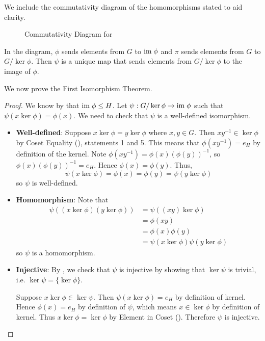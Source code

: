 We include the commutativity diagram of the homomorphisms stated to aid clarity.

\begin{figure}[h]
    \centering
    \caption{Commutativity Diagram for }
\end{figure}

In the diagram, $\phi$ sends elements from $G$ to $\mathrm{im}\;\phi$ and $\pi$ sends elements from $G$ to $G/\ker\phi$. Then $\psi$ is a unique map that sends elements from $G/\ker\phi$ to the image of $\phi$.

We now prove the First Isomorphism Theorem.

\begin{proof}
    We know by  that $\mathrm{im}\;\phi \leq H$. Let $\psi: G/\ker\phi \to \mathrm{im}\;\phi$ such that $\psi(x\ker\phi) = \phi(x)$. We need to check that $\psi$ is a well-defined isomorphism.
    \begin{itemize}
        \item \textbf{Well-defined}: Suppose $x\ker\phi = y\ker\phi$ where $x, y \in G$. Then $xy^{-1} \in \ker\phi$ by Coset Equality (), statements 1 and 5. This means that $\phi(xy^{-1}) = e_H$ by definition of the kernel. Note $\phi(xy^{-1}) = \phi(x)\left(\phi(y)\right)^{-1}$, so $\phi(x)\left(\phi(y)\right)^{-1} = e_H$. Hence $\phi(x) = \phi(y)$. Thus,
        \[
            \psi(x\ker\phi) = \phi(x) = \phi(y) = \psi(y\ker\phi)
        \]
        so $\psi$ is well-defined.

        \item \textbf{Homomorphism}: Note that
        \begin{align*}
            \psi((x\ker\phi)(y\ker\phi)) &= \psi((xy)\ker\phi)\\
            &= \phi(xy)\\
            &= \phi(x)\phi(y)\\
            &= \psi(x\ker\phi)\psi(y\ker\phi)
        \end{align*}
        so $\psi$ is a homomorphism.
        \item \textbf{Injective}: By , we check that $\psi$ is injective by showing that $\ker\psi$ is trivial, i.e. $\ker\psi = \{\ker\phi\}$.

        Suppose $x\ker\phi\in\ker\psi$. Then $\psi(x\ker\phi) = e_H$ by definition of kernel. Hence $\phi(x) = e_H$ by definition of $\psi$, which means $x \in \ker\phi$ by definition of kernel. Thus $x\ker\phi = \ker\phi$ by Element in Coset (). Therefore $\psi$ is injective.


\end{itemize}
\end{proof}
